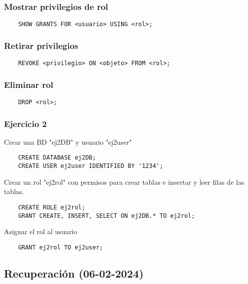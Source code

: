 \documentclass{article}
\begin{document}
\subsubsection{Mostrar privilegios de rol}
\begin{verbatim}
	SHOW GRANTS FOR <usuario> USING <rol>;
\end{verbatim}
\subsubsection{Retirar privilegios}
\begin{verbatim}
	REVOKE <privilegio> ON <objeto> FROM <rol>;
\end{verbatim}
\subsubsection{Eliminar rol}
\begin{verbatim}
	DROP <rol>;
\end{verbatim}
\subsubsection{Ejercicio 2}
Crear una BD "ej2DB" y usuario "ej2user"
\begin{verbatim}
	CREATE DATABASE ej2DB;
	CREATE USER ej2user IDENTIFIED BY '1234';
\end{verbatim}
Crear un rol "ej2rol" con permisos para crear tablas e insertar y leer filas de las tablas.
\begin{verbatim}
	CREATE ROLE ej2rol;
	GRANT CREATE, INSERT, SELECT ON ej2DB.* TO ej2rol;
\end{verbatim}
Asignar el rol al usuario
\begin{verbatim}
	GRANT ej2rol TO ej2user;
\end{verbatim}


\subsection{Recuperación (06-02-2024)}
\end{document}
